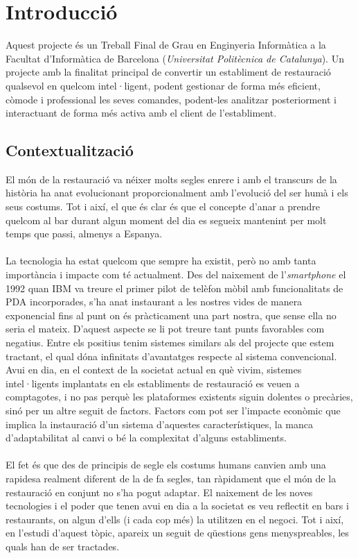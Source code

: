 
\chapter{Introducció} %

\label{Chapter1} %

Aquest projecte és un Treball Final de Grau en Enginyeria Informàtica a la Facultat d'Informàtica de Barcelona (\textit{Universitat Politècnica de Catalunya}). Un projecte amb la finalitat principal de convertir un establiment de restauració qualsevol en quelcom intel·ligent, podent gestionar de forma més eficient, còmode i professional les seves comandes, podent-les analitzar posteriorment i interactuant de forma més activa amb el client de l'establiment.

\section{Contextualització}

El món de la restauració va néixer molts segles enrere i amb el transcurs de la història ha anat evolucionant proporcionalment amb l'evolució del ser humà i els seus costums. Tot i així, el que és clar és que el concepte d'anar a prendre quelcom al bar durant algun moment del dia es segueix mantenint per molt temps que passi, almenys a Espanya.
\\\\
La tecnologia ha estat quelcom que sempre ha existit, però no amb tanta importància i impacte com té actualment. Des del naixement de l'\textit{smartphone} \cite{smartphone} el 1992 quan IBM va treure el primer pilot de telèfon mòbil amb funcionalitats de PDA incorporades, s'ha anat instaurant a les nostres vides de manera exponencial fins al punt on és pràcticament una part nostra, que sense ella no seria el mateix. D'aquest aspecte se li pot treure tant punts favorables com negatius. Entre els positius tenim sistemes similars als del projecte que estem tractant, el qual dóna infinitats d'avantatges respecte al sistema convencional. Avui en dia, en el context de la societat actual en què vivim, sistemes intel·ligents implantats en els establiments de restauració es veuen a comptagotes, i no pas perquè les plataformes existents siguin dolentes o precàries, sinó per un altre seguit de factors. Factors com pot ser l'impacte econòmic que implica la instauració d'un sistema d'aquestes característiques, la manca d'adaptabilitat al canvi o bé la complexitat d'alguns establiments.
\\\\
El fet és que des de principis de segle els costums humans canvien amb una rapidesa realment diferent de la de fa segles, tan ràpidament que el món de la restauració en conjunt no s'ha pogut adaptar.
El naixement de les noves tecnologies i el poder que tenen avui en dia a la societat es veu reflectit en bars i restaurants, on algun d'ells (i cada cop més) la utilitzen en el negoci.
Tot i així, en l'estudi d'aquest tòpic, apareix un seguit de qüestions gens menyspreables, les quals han de ser tractades.

